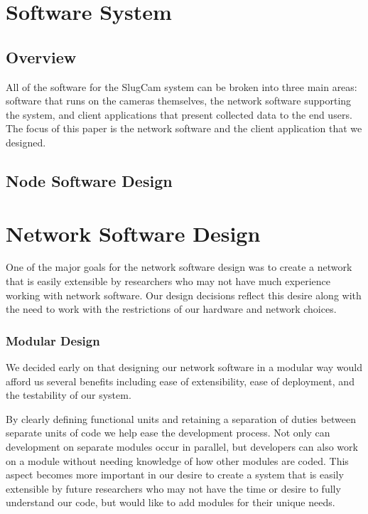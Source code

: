 \section{Software System}
\subsection{Overview}

All of the software for the SlugCam system can be broken into three main areas:
software that runs on the cameras themselves, the network software supporting
the system, and client applications that present collected data to the end
users. The focus of this paper is the network software and the client
application that we designed.

\subsection{Node Software Design}




\section{Network Software Design}

One of the major goals for the network software design was to create a
network that is easily extensible by researchers who may not have much
experience working with network software. Our design decisions reflect this
desire along with the need to work with the restrictions of our hardware and
network choices.

\subsubsection{Modular Design}

We decided early on that designing our network software in a modular way would
afford us several benefits including ease of extensibility, ease of deployment,
and the testability of our system.

By clearly defining functional units and retaining a separation of duties
between separate units of code we help ease the development process. Not only
can development on separate modules occur in parallel, but developers can also
work on a module without needing knowledge of how other modules are coded. This
aspect becomes more important in our desire to create a system that is easily
extensible by future researchers who may not have the time or desire to fully
understand our code, but would like to add modules for their unique needs.


